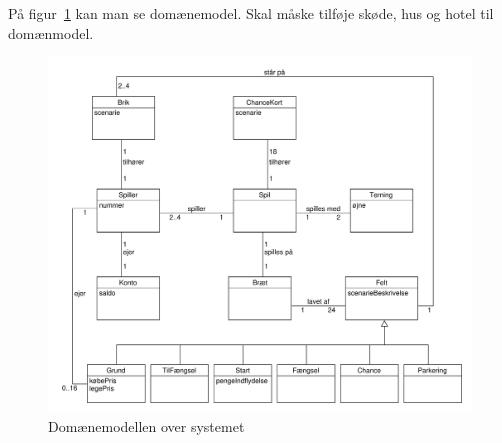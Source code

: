 \documentclass[class=article, crop=false]{standalone}
\begin{document}
    På figur~\ref{fig:domain_model} kan man se domænemodel. Skal måske tilføje skøde, hus og hotel til domænmodel.

            \begin{figure}[H]
                \centering

                \includegraphics[scale=0.3]{diagrams/domain_model.pdf}
                \caption{Domænemodellen over systemet}\label{fig:domain_model}
            \end{figure}
\end{document}
